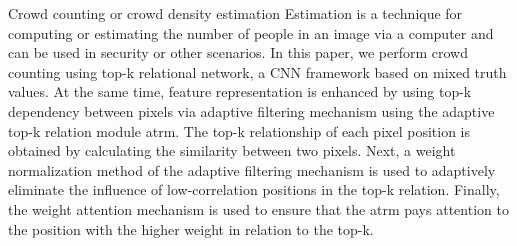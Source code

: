 

\begin{abstracten}
    Crowd counting or crowd density estimation Estimation is a technique for computing or estimating the number of people in an image via a computer and can be used in security or other scenarios. In this paper, we perform crowd counting using top-k relational network, a CNN framework based on mixed truth values. At the same time, feature representation is enhanced by using top-k dependency between pixels via adaptive filtering mechanism using the adaptive top-k relation module atrm. The top-k relationship of each pixel position is obtained by calculating the similarity between two pixels. Next, a weight normalization method of the adaptive filtering mechanism is used to adaptively eliminate the influence of low-correlation positions in the top-k relation. Finally, the weight attention mechanism is used to ensure that the atrm pays attention to the position with the higher weight in relation to the top-k.
\end{abstracten}